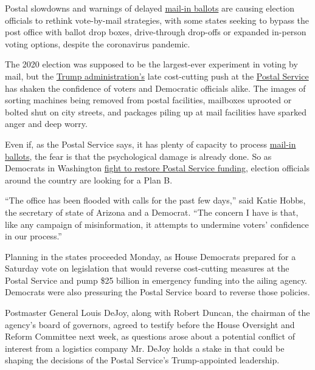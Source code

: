 Postal slowdowns and warnings of delayed
\href{https://www.nytimes3xbfgragh.onion/interactive/2020/08/31/us/politics/vote-by-mail-deadlines.html}{mail-in
ballots} are causing election officials to rethink vote-by-mail
strategies, with some states seeking to bypass the post office with
ballot drop boxes, drive-through drop-offs or expanded in-person voting
options, despite the coronavirus pandemic.

The 2020 election was supposed to be the largest-ever experiment in
voting by mail, but the
\href{https://www.nytimes3xbfgragh.onion/2020/08/18/us/politics/postal-service-suspends-changes.html}{Trump
administration's} late cost-cutting push at the
\href{https://www.nytimes3xbfgragh.onion/2020/08/18/us/politics/postal-service-suspends-changes.html}{Postal
Service} has shaken the confidence of voters and Democratic officials
alike. The images of sorting machines being removed from postal
facilities, mailboxes uprooted or bolted shut on city streets, and
packages piling up at mail facilities have sparked anger and deep worry.

Even if, as the Postal Service says, it has plenty of capacity to
process
\href{https://www.nytimes3xbfgragh.onion/2020/08/20/nyregion/vote-by-mail-new-york.html}{mail-in
ballots}, the fear is that the psychological damage is already done. So
as Democrats in Washington
\href{https://www.nytimes3xbfgragh.onion/2020/08/16/us/politics/coronavirus-postal-service-stimulus-bill.html}{fight
to restore Postal Service funding}, election officials around the
country are looking for a Plan B.

``The office has been flooded with calls for the past few days,'' said
Katie Hobbs, the secretary of state of Arizona and a Democrat. ``The
concern I have is that, like any campaign of misinformation, it attempts
to undermine voters' confidence in our process.''

Planning in the states proceeded Monday, as House Democrats prepared for
a Saturday vote on legislation that would reverse cost-cutting measures
at the Postal Service and pump \$25 billion in emergency funding into
the ailing agency. Democrats were also pressuring the Postal Service
board to reverse those policies.

Postmaster General Louis DeJoy, along with Robert Duncan, the chairman
of the agency's board of governors, agreed to testify before the House
Oversight and Reform Committee next week, as questions arose about a
potential conflict of interest from a logistics company Mr. DeJoy holds
a stake in that could be shaping the decisions of the Postal Service's
Trump-appointed leadership.

